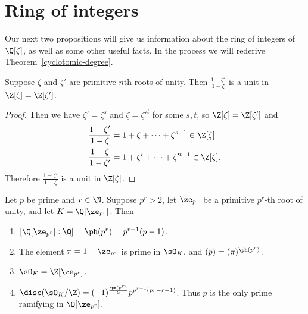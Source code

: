 \section{Ring of integers}
Our next two propositions will give us information about the ring of integers of $\Q[\zeta]$, as well as some other useful facts. In the process we will rederive Theorem~\ref{cyclotomic-degree}.
\begin{pr}
Suppose $\zeta$ and $\zeta'$ are primitive $n$th roots of unity. Then $\frac{1-\zeta'}{1-\zeta}$ is a unit in $\Z[\zeta]=\Z[\zeta']$.
\end{pr}
\begin{proof}
Then we have $\zeta'=\zeta^s$ and $\zeta=\zeta'^t$ for some $s,t$, so $\Z[\zeta]=\Z[\zeta']$ and
\begin{align*}
\frac{1-\zeta'}{1-\zeta}&=1+\zeta+\cdots +\zeta^{s-1}\in\Z[\zeta]\\
\frac{1-\zeta}{1-\zeta'}&=1+\zeta'+\cdots +\zeta'^{t-1}\in\Z[\zeta].
\end{align*}
Therefore $\frac{1-\zeta'}{1-\zeta}$ is a unit in $\Z[\zeta]$.
\end{proof}
\begin{pr}
Let $p$ be prime and $r\in\N$. 
Suppose $p^r>2$, let $\ze_{p^r}$ be a primitive $p^r$-th root of unity, and let $K=\Q[\ze_{p^r}]$. Then
\begin{enumerate}
\item
$[\Q[\ze_{p^r}]:\Q]=\ph(p^r)=p^{r-1}(p-1)$.
\item The element $\pi=1-\ze_{p^r}$ is prime in $\sO_K$, and $(p)=(\pi)^{\ph(p^r)}$.
\item
$\sO_K=\Z[\ze_{p^r}]$.
\item
$\disc(\sO_K/\Z)=(-1)^{\frac{\ph(p^r)}{2}} p^{p^{r-1}(pr-r-1)}$. Thus $p$ is the only prime ramifying in $\Q[\ze_{p^r}]$. 
\end{enumerate}
\end{pr}

